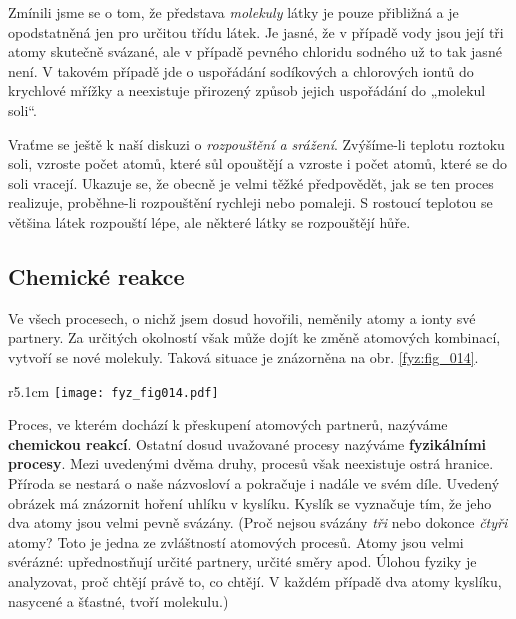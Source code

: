 {      Zmínili jsme se o tom, že představa \emph{molekuly} látky je pouze přibližná a je 
      opodstatněná jen pro určitou třídu látek. Je jasné, že v případě vody jsou její tři atomy 
      skutečně svázané, ale v případě pevného chloridu sodného už to tak jasné není. V takovém 
      případě jde o uspořádání sodíkových a chlorových iontů do krychlové mřížky a neexistuje 
      přirozený způsob jejich uspořádání do „molekul soli“.
      
      Vraťme se ještě k naší diskuzi o \emph{rozpouštění a srážení}. Zvýšíme-li teplotu roztoku 
      soli, vzroste počet atomů, které sůl opouštějí a vzroste i počet atomů, které se do soli 
      vracejí. Ukazuje se, že obecně je velmi těžké předpovědět, jak se ten proces realizuje, 
      proběhne-li rozpouštění rychleji nebo pomaleji. S rostoucí teplotou se většina látek 
      rozpouští lépe, ale některé látky se rozpouštějí hůře.
      
    \subsection{Chemické reakce}
      Ve všech procesech, o nichž jsem dosud hovořili, neměnily atomy a ionty své partnery. Za 
      určitých okolností však může dojít ke změně atomových kombinací, vytvoří se nové molekuly. 
      Taková situace je znázorněna na obr. \ref{fyz:fig_014}.
      
      \begin{wrapfigure}[12]{r}{5.1cm}   %
        \centering
        \texttt{[image: fyz\_fig014.pdf]}
        \caption{Uhlík hořící v kyslíku \cite[s.~23]{Feynman01}}
        \label{fyz:fig_014}
      \end{wrapfigure}
      Proces, ve kterém dochází k přeskupení atomových partnerů, nazýváme \textbf{chemickou 
      reakcí}. Ostatní dosud uvažované procesy nazýváme \textbf{fyzikálními procesy}. Mezi 
      uvedenými dvěma druhy, procesů však neexistuje ostrá hranice. Příroda se nestará o naše 
      názvosloví a pokračuje i nadále ve svém díle. Uvedený obrázek má znázornit hoření uhlíku v 
      kyslíku. Kyslík se vyznačuje tím, že jeho dva atomy jsou velmi pevně svázány. (Proč nejsou 
      svázány \emph{tři} nebo dokonce \emph{čtyři} atomy? Toto je jedna ze zvláštností atomových 
      procesů. Atomy jsou velmi svérázné: upřednostňují určité partnery, určité směry apod. Úlohou 
      fyziky je analyzovat, proč chtějí právě to, co chtějí. V každém případě dva atomy kyslíku, 
      nasycené a šťastné, tvoří molekulu.)
      
}
